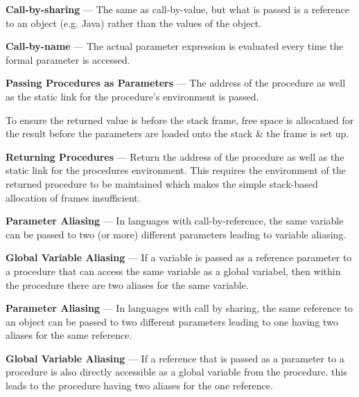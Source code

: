 \textbf{Call-by-sharing} ---
The same as call-by-value, but what is passed is a reference to an object (e.g. Java) rather than 
the values of the object.

\textbf{Call-by-name} ---
The actual parameter expression is evaluated every time the formal parameter is accessed.

\textbf{Passing Procedures as Parameters} ---
The address of the procedure as well as the static link for the procedure's environment is passed.

To ensure the returned value is before the stack frame, free space is allocataed for 
the result before the parameters are loaded onto the stack \& the frame is set up.

\textbf{Returning Procedures} ---
Return the address of the procedure as well as the static link for the procedures environment.
This requires the environment of the returned procedure to be maintained which makes the simple
stack-based allocation of frames insufficient.

\textbf{Parameter Aliasing} ---
In languages with call-by-reference, the same variable can be passed to two (or more) different
parameters leading to variable aliasing.

\textbf{Global Variable Aliasing} ---
If a variable is passed as a reference parameter to a procedure that can access the same variable
as a global variabel, then within the procedure there are two aliases for the same variable.

\textbf{Parameter Aliasing} ---
In languages with call by sharing, the same reference to an object can be passed to two different 
parameters leading to one having two aliases for the same reference.

\textbf{Global Variable Aliasing} ---
If a reference that is passed as a parameter to a procedure is also directly accessible as a 
global variable from the procedure. this leads to the procedure having two aliases for the one 
reference.